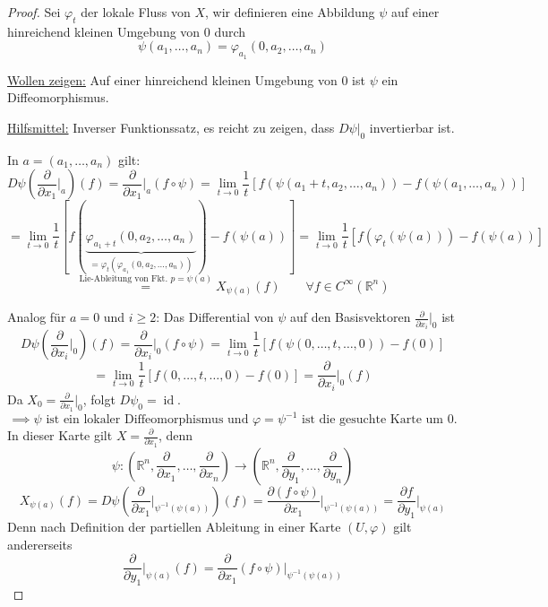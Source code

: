 \documentclass[fleqn, 12pt, letterpaper]{article}
\newcommand{\txt}[1]{\text{#1}}
\begin{document}
\begin{proof}
Sei $\varphi_t$ der lokale Fluss von $X$, wir definieren eine Abbildung $\psi$ auf einer hinreichend kleinen Umgebung von $0$ durch
\[
\psi(a_1, \dots, a_n) = \varphi_{a_1}(0,a_2,\dots,a_n)
\]

\underline{Wollen zeigen:} Auf einer hinreichend kleinen Umgebung von $0$ ist $\psi$ ein Diffeomorphismus.

\underline{Hilfsmittel:} Inverser Funktionssatz, es reicht zu zeigen, dass $D\psi|_0$ invertierbar ist.

\vspace{1em}

In $a = (a_1, \dots, a_n)$ gilt:
\[
D \psi \left(\frac{\partial}{\partial x_1} \big|_a \right)(f) = \frac{\partial}{\partial x_1} \big|_a (f \circ \psi) = \lim_{t \to 0} \frac{1}{t} \left[f \left(\psi(a_1 + t, a_2, \dots, a_n)\right) - f(\psi(a_1, \dots, a_n)) \right]
\]
\[
= \lim_{t \to 0} \frac{1}{t} [f (\underbrace{\varphi_{a_1+t}(0, a_2, \dots, a_n)}_{=\varphi_t(\varphi_{a_1}(0,a_2,\dots,a_n))}) - f(\psi(a)) ] = \lim_{t \to 0} \frac{1}{t} \left[f \left(\varphi_t(\psi(a))\right) - f(\psi(a)) \right]
\]
\[\overset{\txt{Lie-Ableitung von Fkt. }p=\psi(a)}{=} X_{\psi(a)}(f) \qquad \forall f \in C^\infty(\mathbb{R}^n)
\]

Analog für $a = 0$ und $i \geq 2$: Das Differential von $\psi$ auf den Basisvektoren $\frac{\partial}{\partial x_i} \big|_0$ ist
\[
D \psi \left(\frac{\partial}{\partial x_i} \big|_0 \right)(f) = \frac{\partial}{\partial x_i} \big|_0 (f \circ \psi) = \lim_{t \to 0} \frac{1}{t} \left[f(\psi(0, \dots, t, \dots, 0)) - f(0)\right]
\]
\[
= \lim_{t \to 0} \frac{1}{t} \left[f(0, \dots, t, \dots, 0) - f(0)\right] = \frac{\partial}{\partial x_i} \big|_0 (f)
\]
Da $X_0 = \frac{\partial}{\partial x_1} \big|_0$, folgt $D\psi_0 = \operatorname{id}$.
\[
\implies \psi \text{ ist ein lokaler Diffeomorphismus und } \varphi = \psi^{-1} \text{ ist die gesuchte Karte um 0.}
\]
In dieser Karte gilt $X = \frac{\partial}{\partial x_1}$, denn
\[
\psi : \left(\mathbb{R}^n, \frac{\partial}{\partial x_1}, \dots, \frac{\partial}{\partial x_n} \right) \longrightarrow \left(\mathbb{R}^n, \frac{\partial}{\partial y_1}, \dots, \frac{\partial}{\partial y_n} \right)
\]
\[
X_{\psi(a)}(f) = D\psi \left(\frac{\partial}{\partial x_1} \big|_{\psi^{-1}(\psi(a))} \right)(f) = \frac{\partial (f \circ \psi)}{\partial x_1} \big|_{\psi^{-1}(\psi(a))} = \frac{\partial f}{\partial y_1} \big|_{\psi(a)}
\]
Denn nach Definition der partiellen Ableitung in einer Karte $(U, \varphi)$ gilt andererseits
\[\frac{\partial}{\partial y_1} \big|_{\psi(a)} (f) 
= \frac{\partial}{\partial x_1} (f \circ \psi) \big|_{\psi^{-1}(\psi(a))}
\]
\end{proof}
\end{document}
